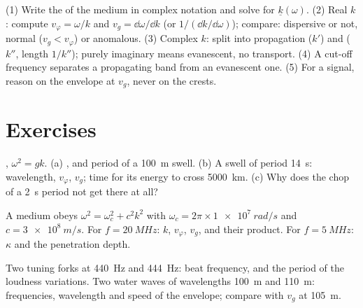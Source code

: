 \begin{method}\label{met:b2:dispersion-wave-packets:method}
(1) Write the  of the medium in complex notation and
solve for $\underline k(\omega)$. (2) Real $k$: compute $v_\varphi = \omega/k$ and
$v_g = \dd\omega/\dd k$ (or $1/(\dd k/\dd\omega)$); compare: dispersive or not,
normal ($v_g < v_\varphi$) or anomalous. (3) Complex $k$: split into
propagation ($k'$) and  ($k''$, length $1/k''$); purely
imaginary means evanescent, no transport. (4) A cut-off frequency
separates a propagating band from an evanescent one. (5) For a signal,
reason on the envelope at $v_g$, never on the crests.
\end{method}

\section{Exercises}

\begin{exercise}[$\star$]\label{exo:b2:dispersion-wave-packets:1}
, $\omega^2 = gk$. (a) ,  and
period of a \qty{100}{m} swell. (b) A swell of period \qty{14}{s}:
wavelength, $v_\varphi$, $v_g$; time for its energy to cross \qty{5000}{km}.
(c) Why does the chop of a \qty{2}{s} period not get there at all?
\end{exercise}

\begin{exercise}[$\star$]\label{exo:b2:dispersion-wave-packets:2}
A medium obeys $\omega^2 = \omega_c^2 + c^2k^2$ with $\omega_c = 2\pi \times \qty{1e7}{rad/s}$
and $c = \qty{3e8}{m/s}$. For $f = \qty{20}{MHz}$: $k$, $v_\varphi$, $v_g$, and
their product. For $f = \qty{5}{MHz}$: $\kappa$ and the penetration depth.
\end{exercise}

\begin{exercise}[$\star$]\label{exo:b2:dispersion-wave-packets:3}
Two tuning forks at \qty{440}{Hz} and \qty{444}{Hz}: beat frequency, and
the period of the loudness variations. Two water waves of wavelengths
\qty{100}{m} and \qty{110}{m}: frequencies, wavelength and speed of the
envelope; compare with $v_g$ at \qty{105}{m}.
\end{exercise}

